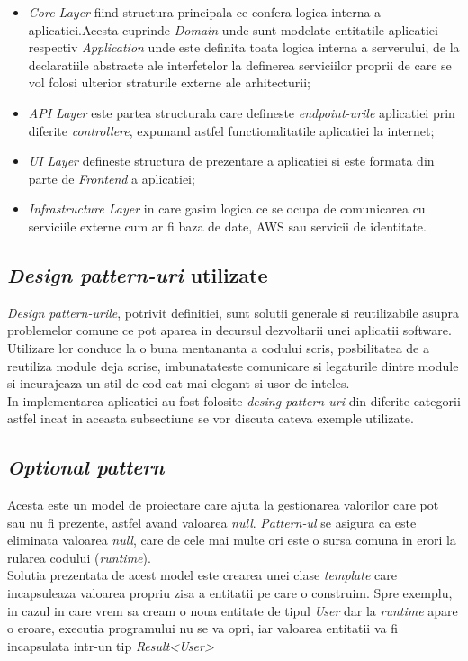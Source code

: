 \begin{itemize}
	\item  \textit{Core Layer} fiind structura principala ce confera logica interna a aplicatiei.Acesta cuprinde \textit{Domain} unde sunt modelate entitatile aplicatiei respectiv \textit{Application} unde este definita toata logica interna a serverului,
	de la declaratiile abstracte ale interfetelor la definerea serviciilor proprii de care se vol folosi ulterior straturile externe ale arhitecturii;
	
	\item \textit{API Layer} este partea structurala care defineste \textit{endpoint-urile} aplicatiei prin diferite \textit{controllere}, expunand astfel functionalitatile aplicatiei la internet;
	
  	\item \textit{UI Layer} defineste structura de prezentare a aplicatiei si este formata din parte de \textit{Frontend} a aplicatiei;
  
 	 \item \textit{Infrastructure Layer} in care gasim logica ce se ocupa de comunicarea cu serviciile externe cum ar fi baza de date, AWS sau servicii de identitate.
 	 
\end{itemize}

\subsection*{\textit{Design pattern-uri} utilizate}

\textit{Design pattern-urile}, potrivit definitiei, sunt solutii generale si reutilizabile asupra problemelor comune ce pot aparea in decursul dezvoltarii unei aplicatii software.\\
Utilizare lor conduce la o buna mentananta a codului scris, posbilitatea de a reutiliza module deja scrise, imbunatateste comunicare si legaturile dintre module si incurajeaza un stil de cod cat mai elegant si usor de inteles.\\
In implementarea aplicatiei au fost folosite \textit{desing pattern-uri} din diferite categorii astfel incat in aceasta subsectiune se vor discuta cateva exemple utilizate.

\subsection*{\textit{Optional pattern}}
Acesta este un model de proiectare care ajuta la gestionarea valorilor care pot sau nu fi prezente, astfel avand valoarea \textit{null}. \textit{Pattern-ul} se asigura ca este eliminata valoarea \textit{null}, care de cele mai multe ori este o sursa comuna in erori la rularea codului (\textit{runtime}).\\
Solutia prezentata de acest model este crearea unei clase \textit{template} care incapsuleaza valoarea propriu zisa a entitatii pe care o construim. Spre exemplu, in cazul in care vrem sa cream o noua entitate de tipul \textit{User} dar la \textit{runtime} apare o eroare, executia programului nu se va opri, iar valoarea entitatii va fi incapsulata intr-un tip   \textit{Result\textless User\textgreater}

